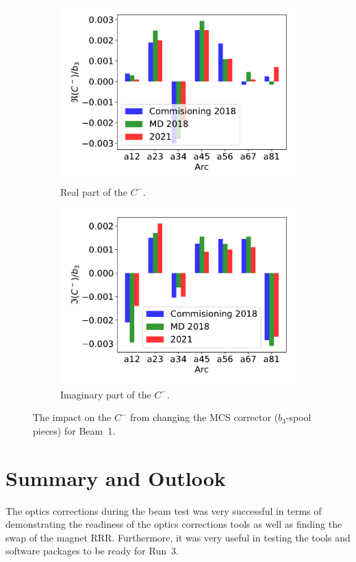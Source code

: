 \documentclass[a4paper]{cernatsnote}
\begin{document}
\begin{figure}[ht]
\begin{subfigure}{.5\textwidth}
  \centering
  \includegraphics[width=.8\linewidth]{plots/MCS/b2_change_re_per_b3.pdf}  
  \caption{Real part of the $C^-$.}
\end{subfigure}
\begin{subfigure}{.5\textwidth}
  \centering
  \includegraphics[width=.8\linewidth]{plots/MCS/b_2change_im_per_b3.pdf}  
  \caption{Imaginary part of the $C^-$.}
\end{subfigure}
\caption{The impact on the $C^-$ from changing the MCS corrector ($b_3$-spool pieces) for Beam~1.}
\label{fig:beam2_mcs}
\end{figure}


\section{Summary and Outlook}
The optics corrections during the beam test was very successful in terms of demonstrating the readiness of the optics corrections tools as well as finding the swap of the magnet RRR. Furthermore, it was very useful in testing the tools and software packages to be ready for Run~3. 
\end{document}
